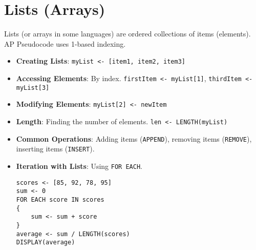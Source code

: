 \documentclass[11pt,oneside]{book}
\begin{document}
\section{Lists (Arrays)}
\label{sec:lists}
Lists (or arrays in some languages) are ordered collections of items (elements). AP Pseudocode uses 1-based indexing.
\begin{itemize}
    \item \textbf{Creating Lists}: \texttt{myList <- [item1, item2, item3]}
    \item \textbf{Accessing Elements}: By index. \texttt{firstItem <- myList[1]}, \texttt{thirdItem <- myList[3]}
    \item \textbf{Modifying Elements}: \texttt{myList[2] <- newItem}
    \item \textbf{Length}: Finding the number of elements. \texttt{len <- LENGTH(myList)}
    \item \textbf{Common Operations}: Adding items (\texttt{APPEND}), removing items (\texttt{REMOVE}), inserting items (\texttt{INSERT}).
    \item \textbf{Iteration with Lists}: Using \texttt{FOR EACH}.
    \begin{lstlisting}[language={}, label={lst:list_iteration}, caption={AP Pseudocode: List Iteration}]
scores <- [85, 92, 78, 95]
sum <- 0
FOR EACH score IN scores
{
    sum <- sum + score
}
average <- sum / LENGTH(scores)
DISPLAY(average)
\end{lstlisting}
\end{itemize}
\end{document}
